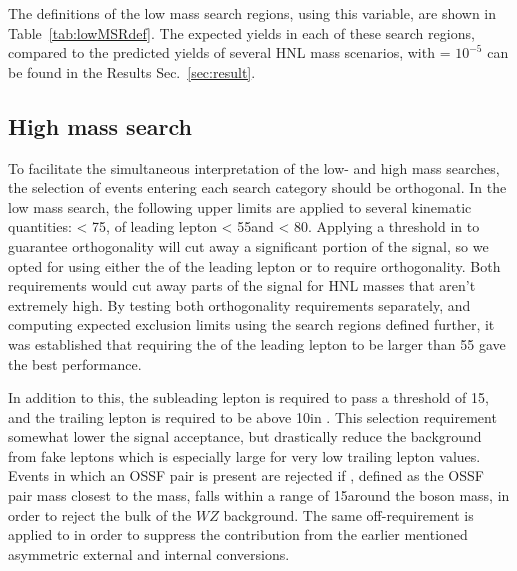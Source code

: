 The definitions of the low mass
search regions, using this variable, are shown in
Table~\ref{tab:lowMSRdef}. The expected yields in each of these search
regions, compared to the predicted yields of several HNL mass
scenarios, with \mixpar = $10^{-5}$ can be found in the Results Sec.~\ref{sec:result}.  

\begin{table}[tbh]
\centering
\caption{Search regions in the low mass category.}
\label{tab:lowMSRdef}
\end{table}



\subsection{High mass search}
To facilitate the simultaneous interpretation of the low- and high mass searches, the selection of events entering each search category should be orthogonal. In the low mass search, the following upper limits are applied to several kinematic quantities: 
\ptmiss < 75\GeV, \pt of leading lepton < 55\GeV and \mlll<
80\GeV. Applying a threshold in \ptmiss to guarantee orthogonality will
cut away a significant portion of the signal, so we opted for using
either the \pt of the leading lepton or \mlll to require
orthogonality. Both requirements would cut away parts of the signal
for HNL masses that aren't extremely high. By testing both
orthogonality requirements separately, and computing expected
exclusion limits using the search regions defined further,
 it was established that requiring the \pt of the leading lepton to be
 larger than 55 \GeV gave the best performance.
 
In addition to this, the subleading lepton is
 required to pass a \pt threshold of 15\GeV, and the trailing lepton
 is required to be above 10\GeV in \pt .
 This selection requirement somewhat lower the signal acceptance, but drastically
 reduce the background from fake leptons which is especially large for
 very low trailing lepton \pt values. Events in which an OSSF pair is
 present are rejected if \Mll, defined as the OSSF pair mass closest
 to the \PZ mass, falls within a range of 15\GeV around the \PZ boson
 mass, in order to reject the bulk of the $WZ$ background.
 The same off-\PZ requirement is applied to \mlll in order to suppress
 the contribution from the earlier mentioned asymmetric external and
 internal conversions.


